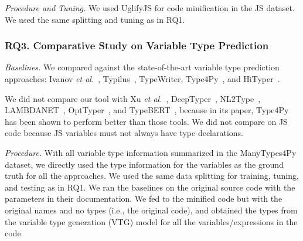
\textit{Procedure and Tuning.} We used UglifyJS for code minification
in the JS dataset. We used the same splitting and tuning as in RQ1.




\subsubsection{RQ3. Comparative Study on Variable Type Prediction\\}

{\em Baselines.} We compared {\tool} against the state-of-the-art
  variable type prediction approaches: Ivanov {\em et
  al.}~\cite{ivanov21predicting}, Typilus~\cite{typilus-pldi20},
  TypeWriter\cite{typewriter-fse20}, Type4Py~\cite{Type4Py-icse22},
  and HiTyper~\cite{HiTyper-icse22}.


We did not compare our tool with Xu {\em et al.}~\cite{xu-fse16},
DeepTyper~\cite{DeepTyper-fse18}, NL2Type~\cite{nl2type-icse19},
LAMBDANET~\cite{LambdaNet-iclr20}, OptTyper~\cite{optyper20}, and
TypeBERT~\cite{typeBERT-fse21}, because in its paper, Type4Py has been
shown to perform better than those tools.
We did not compare on JS code because JS variables must not always
have type declarations.


\textit{Procedure.}  With all variable type information summarized in
the ManyTypes4Py dataset, we directly used the type information for
the variables as the ground truth for all the approaches. We used the
same data splitting for training, tuning, and testing as in RQ1. We
ran the baselines on the original source code with the parameters in
their documentation. We fed to {\tool} the minified code but with the
original names and no types (i.e., the original code), and obtained
the types from the variable type generation (VTG) model for all the
variables/expressions in the code.

